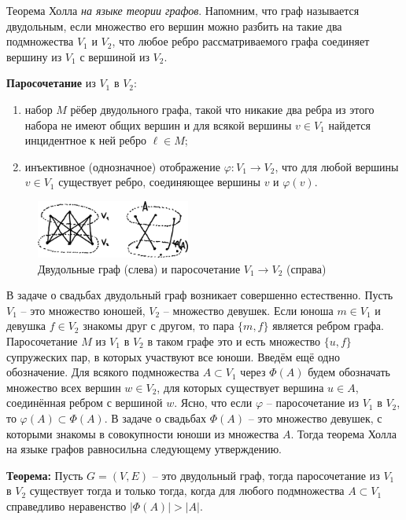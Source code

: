 \documentclass[12pt, a4paper]{article}
\begin{document}
Теорема Холла \textit{на языке теории графов}. Напомним, что граф называется двудольным, если множество его вершин можно разбить на такие два подмножества $V_1$ и $V_2$, что любое ребро рассматриваемого графа соединяет вершину из $V_1$ с вершиной из $V_2$.

\textbf{Паросочетание} из $V_1$ в $V_2$:
\begin{enumerate}
\item набор $M$ рёбер двудольного графа, такой что никакие два ребра из этого набора не имеют общих вершин и для всякой вершины $v \in V_1$ найдется инцидентное к ней ребро $\ell \in M$;
\item инъективное (однозначное) отображение $\varphi: V_1 \to V_2$, что для любой вершины $v \in V_1$ существует ребро, соединяющее вершины $v$ и $\varphi (v)$.
\end{enumerate}

\begin{figure}[h]
 \centering
 \includegraphics[width=0.45\textwidth]{43}
 \vspace{-4mm}
 \caption{Двудольные граф (слева) и паросочетание $V_1 \to V_2$ (справа)}
\end{figure}

В задаче о свадьбах двудольный граф возникает совершенно естественно. Пусть $V_1$ -- это множество юношей, $V_2$ -- множество девушек. Если юноша $m \in V_1$ и девушка $f \in V_2$ знакомы друг с другом, то пара $\{ m,f \}$ является ребром графа. Паросочетание $M$ из $V_1$ в $V_2$ в таком графе это и есть множество $\{ u,f \}$ супружеских пар, в которых участвуют все юноши. Введём ещё одно обозначение. Для всякого подмножества $A \subset V_1$ через $\Phi (A)$ будем обозначать множество всех вершин $w \in V_2$, для которых существует вершина $u \in  A$, соединённая ребром с вершиной $w$. Ясно, что если $\varphi$ -- паросочетание из $V_1$ в $V_2$, то $\varphi (A) \subset \Phi (A)$. В задаче о свадьбах $\Phi (A)$ -- это множество девушек, с которыми знакомы в совокупности юноши из множества $A$. Тогда теорема Холла на языке графов равносильна следующему утверждению.

\textbf{Теорема:} Пусть $G = (V,E)$ -- это двудольный граф, тогда паросочетание из $V_1$ в $V_2$ существует тогда и только тогда, когда для любого подмножества $A \subset V_1$ справедливо неравенство $|\Phi (A)| > |A|$.
\end{document}
